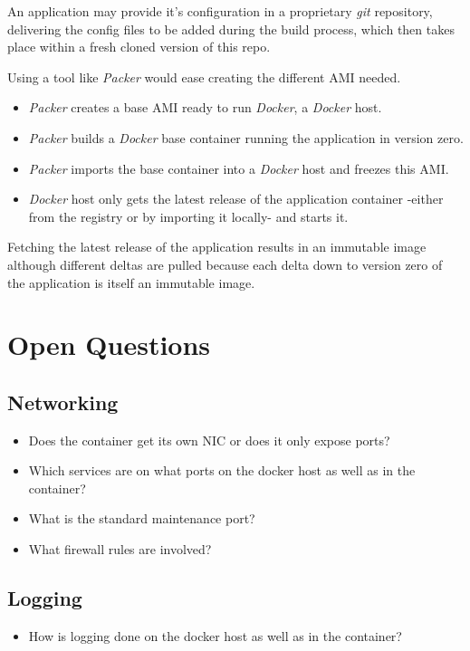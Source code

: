 \documentclass[captions=tableheading]{article}
\begin{document}
An application may provide it's configuration in a proprietary \emph{git} repository, delivering the config files to be added during the build process, which then takes place within a fresh cloned version of this repo. 


Using a tool like \emph{Packer} would ease creating the different AMI needed.
\begin{itemize}
\item \emph{Packer} creates a base AMI ready to run \emph{Docker}, a \emph{Docker} host.
\item \emph{Packer} builds a \emph{Docker} base container running the application in version zero.
\item \emph{Packer} imports the base container into a \emph{Docker} host and freezes this AMI.
\item \emph{Docker} host only gets the latest release of the application container -either from the registry or by importing it locally- and starts it.
\end{itemize}
Fetching the latest release of the application results in an immutable image although different deltas are pulled because each delta down to version zero of the application is itself an  immutable image.
\section{Open Questions}
\label{sec-10}
\subsection{Networking}
\label{sec-10-1}

\begin{itemize}
\item Does the container get its own NIC or does it only expose ports?
\item Which services are on what ports on the docker host as well as in the container?
\item What is the standard maintenance port?
\item What firewall rules are involved?
\end{itemize}
\subsection{Logging}
\label{sec-10-2}

\begin{itemize}
\item How is logging done on the docker host as well as in the container?
\end{itemize}
\end{document}
